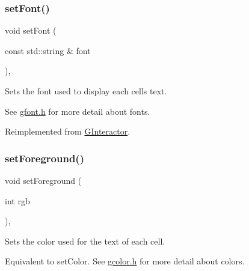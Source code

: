 \mbox{\label{classsgl_1_1GTable_a51367c9fd2709973b1f7238734f93891}} 
\subsubsection{\texorpdfstring{set\+Font()}{setFont()}\hspace{0.1cm}{\footnotesize\ttfamily [2/2]}}
{\footnotesize\ttfamily void set\+Font (\begin{DoxyParamCaption}\item[{const std\+::string \&}]{font }\end{DoxyParamCaption})\hspace{0.3cm}{\ttfamily [override]}, {\ttfamily [virtual]}}



Sets the font used to display each cell\textquotesingle{}s text. 

See \mbox{\hyperlink{gfont_8h_source}{gfont.\+h}} for more detail about fonts. 

Reimplemented from \mbox{\hyperlink{classsgl_1_1GInteractor_a8e096e8818d838aceae1d46d58fb3a7b}{G\+Interactor}}.

\mbox{\label{classsgl_1_1GTable_a59f7cd2bd1708c12dfa52a8f7c7b79c9}} 
\subsubsection{\texorpdfstring{set\+Foreground()}{setForeground()}\hspace{0.1cm}{\footnotesize\ttfamily [1/2]}}
{\footnotesize\ttfamily void set\+Foreground (\begin{DoxyParamCaption}\item[{int}]{rgb }\end{DoxyParamCaption})\hspace{0.3cm}{\ttfamily [override]}, {\ttfamily [virtual]}}



Sets the color used for the text of each cell. 

Equivalent to set\+Color. See \mbox{\hyperlink{gcolor_8h_source}{gcolor.\+h}} for more detail about colors. 

